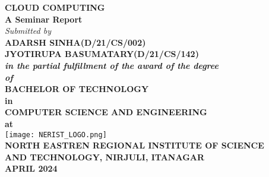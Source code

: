 \documentclass[12pt,a4paper]{article}
\begin{document}
\begin{center}
\huge\textbf{CLOUD COMPUTING}\\
\vspace{0.3in}
\Large\textbf{A Seminar Report}\\
\vspace{0.2in}
\Large\textit{Submitted by}\\
\vspace{0.2in}
\LARGE\textbf{ADARSH SINHA(D/21/CS/002)}\\
\LARGE\textbf{JYOTIRUPA BASUMATARY(D/21/CS/142)}\\
\vspace{0.2in}
\Large\textbf{\textit{in the partial fulfillment of the award of the degree}}\\
\linespread{1.5}
\Large\textbf{\textit{of}}\\
\vspace{0.1in}
\LARGE\textbf{BACHELOR OF TECHNOLOGY}\\
\Large\textbf{in}\\
\Large\textbf{COMPUTER SCIENCE AND ENGINEERING}\\
\Large\textbf{at}\\
\vspace{0.1in}
\texttt{[image: NERIST\_LOGO.png]}\\
\LARGE\textbf{NORTH EASTREN REGIONAL INSTITUTE OF SCIENCE}\\
\LARGE\textbf{AND TECHNOLOGY, NIRJULI, ITANAGAR}\\
\Large\textbf{APRIL 2024}\\
\end{center}
\end{document}
